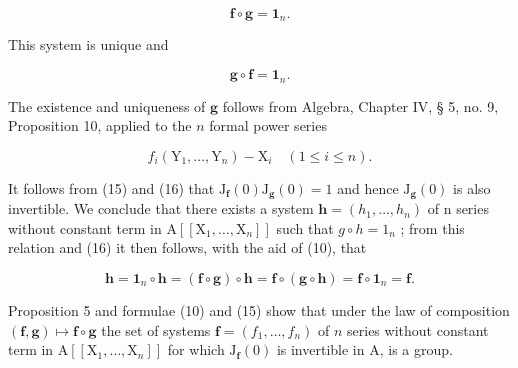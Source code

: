 \[
\mathbf {f} \circ \mathbf {g} = \mathbf {1} _ {n}.\tag{16}
\]

This system is unique and

\[
\mathbf {g} \circ \mathbf {f} = \mathbf {1} _ {n}.\tag{17}
\]

The existence and uniqueness of \(\mathbf{g}\) follows from Algebra, Chapter IV, § 5, no. 9, Proposition 10, applied to the \(n\) formal power series

\[
f _ {i} (\mathrm{Y} _ {1}, \dots , \mathrm{Y} _ {n}) - \mathrm{X} _ {i} \quad (1 \leqslant i \leqslant n).
\]

It follows from (15) and (16) that \(\mathrm{J}_{\mathbf{f}}(0)\mathrm{J}_{\mathbf{g}}(0)=1\) and hence \(\mathrm{J}_{\mathbf{g}}(0)\) is also invertible. We conclude that there exists a system \(\mathbf{h}=(h_{1},\ldots,h_{n})\) of n series without constant term in \(\mathrm{A}[[\mathrm{X}_{1},\ldots,\mathrm{X}_{n}]]\) such that \(g\circ h=1_{n}\) ; from this relation and (16) it then follows, with the aid of (10), that

\[
\mathbf {h} = \mathbf {1} _ {n} \circ \mathbf {h} = (\mathbf {f} \circ \mathbf {g}) \circ \mathbf {h} = \mathbf {f} \circ (\mathbf {g} \circ \mathbf {h}) = \mathbf {f} \circ \mathbf {1} _ {n} = \mathbf {f}.
\]

Proposition 5 and formulae (10) and (15) show that under the law of composition \((\mathbf{f},\mathbf{g})\mapsto \mathbf{f}\circ \mathbf{g}\) the set of systems \(\mathbf{f} = (f_1,\dots ,f_n)\) of \(n\) series without constant term in \(\mathrm{A}[[\mathrm{X}_1,\dots ,\mathrm{X}_n]]\) for which \(\mathrm{J}_{\mathbf{f}}(0)\) is invertible in A, is a group.

